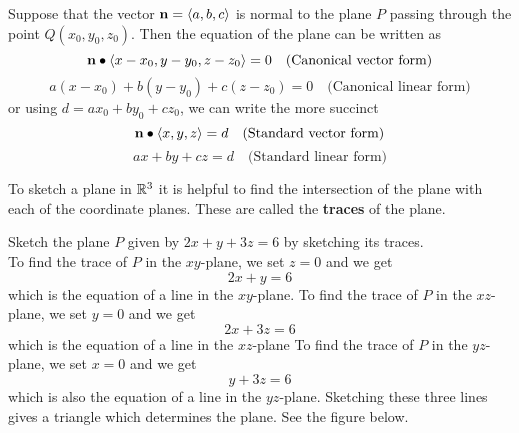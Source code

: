 \documentclass[handout]{ximera}
\begin{document}
\begin{proposition}
Suppose that the vector $\mathbf{n} = \left\langle a,b,c\right\rangle$ is normal to the plane $P$ passing through the point $Q(x_0, y_0, z_0)$.
Then the equation of the plane can be written as
\[
\mathbf{n} \bullet \left\langle x-x_0, y-y_0, z-z_0\right\rangle = 0 \quad \text{(Canonical vector form)}
\]
\[
a(x-x_0) + b(y-y_0) + c(z-z_0) = 0 \quad \text{(Canonical linear form)}
\]
or using $d = ax_0 + by_0 + cz_0$,  we can write the more succinct
\[
\mathbf{n} \bullet \left\langle x, y, z\right\rangle = d \quad \text{(Standard vector form)}
\]
\[
ax+by+cz = d \quad \text{(Standard linear form)}
\]
\end{proposition}

To sketch a plane in $\mathbb R^3$ it is helpful to find the intersection of the plane with each of the coordinate planes.  
These are called the {\bf traces} of the plane.

\begin{example}
Sketch the plane $P$ given by $2x + y + 3z = 6$ by sketching its traces.\\
To find the trace of $P$ in the $xy$-plane, we set $z = 0$ and we get
\[
2x +y = 6
\]
which is the equation of a line in the $xy$-plane.
To find the trace of $P$ in the $xz$-plane, we set $y = 0$ and we get
\[
2x +3z = 6
\]
which is the equation of a line in the $xz$-plane
To find the trace of $P$ in the $yz$-plane, we set $x = 0$ and we get
\[
 y + 3z = 6
\]
which is also the equation of a line in the $yz$-plane.
Sketching these three lines gives a triangle which determines the plane.
See the figure below.

\begin{image}
\end{image}

\end{example}
\end{document}
